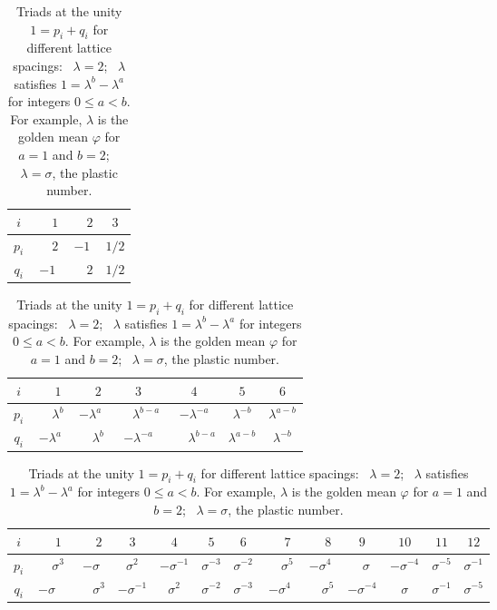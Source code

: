 \documentclass[12pt]{article}
\theoremstyle{definition}
\begin{document}
	\begin{table}[t]
		\begin{subtable}{.35\textwidth}
			\caption{} %
			\centering %
			\begin{tabular}{c c c c} %
				\hline\hline %
				$i$&$\phantom{-}1$&$\phantom{-}2$&$3$ \\
				\hline
				$p_i$&$\phantom{-}2$&$-1$&$1/2$ \\ 
				$q_i$&$-1$&$\phantom{-}2$&$1/2$ \\
				\hline\hline
			\end{tabular}
			\label{TAB:DN}
		\end{subtable}\hspace*{.05\textwidth}
		\begin{subtable}{.6\textwidth}
			\caption{} %
			\centering %
			\begin{tabular}{c c c c c c c} %
				\hline\hline %
				$i$&$\phantom{-}1$&$\phantom{-}2$&$3$&$4$&$5$&$6$ \\
				\hline
				$p_i$&$\phantom{-}\lambda^b$&$-\lambda^a$&$\phantom{-}\lambda^{b-a}$&$-\lambda^{-a}$&$\lambda^{-b}$&$\lambda^{a-b}$ \\ 
				$q_i$&$-\lambda^a$&$\phantom{-}\lambda^b$&$-\lambda^{-a}$&$\phantom{-}\lambda^{b-a}$&$\lambda^{a-b}$&$\lambda^{-b}$ \\
				\hline\hline
			\end{tabular}
			\label{TAB:general}
		\end{subtable}\vspace*{20pt}
		\begin{subtable}{\textwidth}
			\caption{} %
			\centering %
			\begin{tabular}{c c c c c c c c c c c c c} %
				\hline\hline %
				$i$&$\phantom{-}1$&$\phantom{-}2$&$3$&$4$&$5$&$6$&$\phantom{-}7$&$\phantom{-}8$&$9$&$10$&$11$&$12$ \\
				\hline
				$p_i$&$\phantom{-}\sigma^3$&$-\sigma$&$\sigma^2$&$-\sigma^{-1}$&$\sigma^{-3}$&$\sigma^{-2}$&
				$\phantom{-}\sigma^5$&$-\sigma^4$&$\phantom{-}\sigma^{\phantom{-}}$&$-\sigma^{-4}$&$\sigma^{-5}$&$\sigma^{-1}$ \\
				$q_i$&$-\sigma^{\phantom{-}}$&$\phantom{-}\sigma^3$&$-\sigma^{-1}$&$\sigma^2$&$\sigma^{-2}$&$\sigma^{-3}$&
				$-\sigma^4$&$\phantom{-}\sigma^5$&$-\sigma^{-4}$&$\sigma$&$\sigma^{-1}$&$\sigma^{-5}$ \\
				\hline\hline
			\end{tabular}
			\label{TAB:extended}
		\end{subtable}
		\caption{Triads at the unity $1 = p_i + q_i$ for different lattice spacings: ~$\lambda = 2$;
			~$\lambda$ satisfies $1 = \lambda^b-\lambda^a$ for integers $0 \leq a <b$. For example, $\lambda$ is the golden mean $\varphi$ for $a = 1$ and $b = 2$;
			~$\lambda = \sigma$, the plastic number.}
		\label{TAB:triads_unity}
	\end{table}
	
\end{document}
